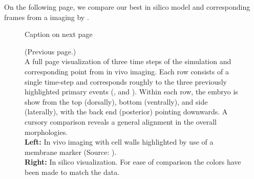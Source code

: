 On the following page, we compare our best in silico model and corresponding frames from a imaging by .

\begin{figure}[H]
    \centering
    \vspace*{-1cm}\hspace*{-1cm}
    \caption{Caption on next page}
    \label{fig:big-visual-comparison}
\end{figure}
\newpage
\addtocounter{figure}{-1}
\begin{figure} [t!]
  \caption{(Previous page.) \\A full page visualization of three time steps of the simulation and corresponding point from in vivo imaging. 
  Each row consists of a single time-step and corresponds roughly to the three previously highlighted primary events (,  and ). Within each row, the embryo is show from the top (dorsally), bottom (ventrally), and side (laterally), with the back end (posterior) pointing downwards.
  A cursory comparison reveals a general alignment in the overall morphologies.\\
  \textbf{Left:} In vivo imaging with cell walls highlighted by use of a membrane marker (Source: ).\\ \textbf{Right:} In silico visualization. For ease of comparison the colors have been made to match the data.}
\end{figure}


